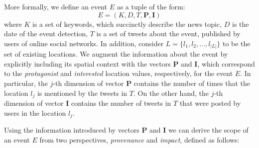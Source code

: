 More formally, we define an event $E$ as a tuple of the form:
%
\begin{equation} \label{eq:event}
E = (K, D, T, \mathbf{P}, \mathbf{I})
\end{equation}
%
\noindent where $K$ is  a set of keywords, which succinctly describe the news
topic, $D$ is the date of the event detection, $T$ is a set of tweets about the
event, published by users of online social networks.
In addition, consider $L=\{l_1, l_2,\ldots, l_{|L|}\}$ to be the set of existing
locations. 
%
We augment the information about the event by explicitly including its spatial
context with the vectors $\mathbf{P}$ and $\mathbf{I}$, which correspond to the
{\em protagonist} and {\em interested} location values, respectively, for the
event $E$. 
%
In particular, the $j$-th dimension of vector $\mathbf{P}$ contains the number of
times that the location $l_j$ is mentioned by the tweets in $T$. 
%
On the other hand, the $j$-th dimension of vector $\mathbf{I}$ contains the
number of tweets in $T$ that were posted by users in the location $l_j$.


Using the information introduced by vectors $\mathbf{P}$ and $\mathbf{I}$ we can
derive the scope of an event $E$ from two perspectives, {\em provenance} and
{\em impact}, defined as follows:

